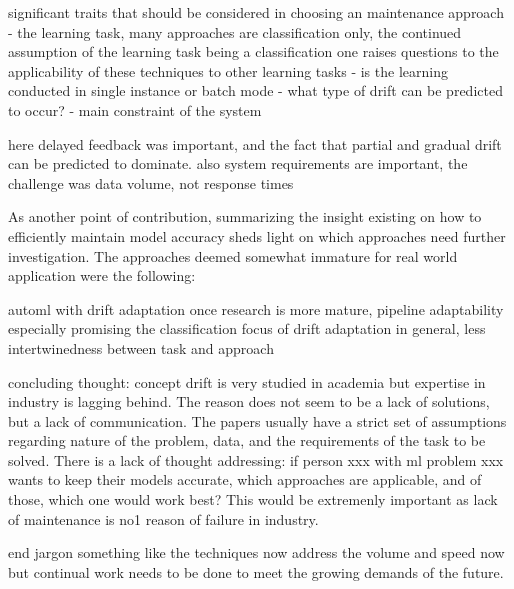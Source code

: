 significant traits that should be considered in choosing an maintenance approach
 - the learning task, many approaches are classification only, the continued assumption of the learning task being a classification one raises questions to the applicability of these techniques to other learning tasks
 - is the learning conducted in single instance or batch mode
 - what type of drift can be predicted to occur?
 - main constraint of the system
 
 here delayed feedback was important, and the fact that partial and gradual drift can be predicted to dominate. also system requirements are important, the challenge was data volume, not response times
 
 As another point of contribution, summarizing the insight existing on how to efficiently maintain model accuracy sheds light on which approaches need further investigation. The approaches deemed somewhat immature for real world application were the following:
 
 automl with drift adaptation once research is more mature, pipeline adaptability especially promising
 the classification focus of drift adaptation in general, less intertwinedness between task and approach
 
 concluding thought: concept drift is very studied in academia but expertise in industry is lagging behind. The reason does not seem to be a lack of solutions, but a lack of communication. The papers usually have a strict set of assumptions regarding nature of the problem, data, and the requirements of the task to be solved. There is a lack of thought addressing: if person xxx with ml problem xxx wants to keep their models accurate, which approaches are applicable, and of those, which one would work best? This would be extremenly important as lack of maintenance is no1 reason of failure in industry.
 
 end jargon something like the techniques now address the volume and speed now but continual work needs to be done to meet the growing demands of the future.
